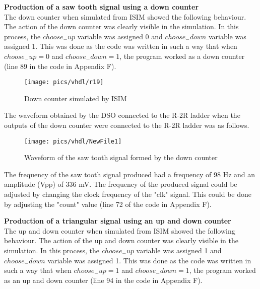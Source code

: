 \pagebreak

\noindent
\textbf{Production of a saw tooth signal using a down counter}\\


\noindent
The  down counter when simulated from ISIM showed the following behaviour. The action of the down counter was clearly visible in the simulation.  In this process, the $  choose_{-}up $ variable was assigned 0 and $ choose_{-}down $ variable was assigned 1. This was done as the code was written in such a way that when  $ choose_{-}up = 0 $ and $ choose_{-}down = 1 $, the program worked as a down counter (line 89 in the code in Appendix F). 


\begin{figure}[!h]
	\centering
	\texttt{[image: pics/vhdl/r19]}
	\caption{Down counter simulated by ISIM}
	\label{fig:r17}
\end{figure}

\noindent
The waveform obtained by the DSO connected to the R-2R ladder when the outputs of the down counter were connected to the R-2R ladder was as follows.

\begin{figure}[!h]
	\centering
	\texttt{[image: pics/vhdl/NewFile1]}
	\caption{Waveform of the saw tooth signal formed by the down counter}
	\label{fig:newfile0}
\end{figure}

\noindent
The frequency of the saw tooth signal produced had a frequency of 98 Hz and an amplitude (Vpp) of 336 mV. The frequency of the produced signal could be adjusted by changing the clock frequency of the "clk" signal. This could be done by adjusting the "count" value (line 72 of the code in Appendix F).\\

\pagebreak


\noindent
\textbf{Production of a triangular signal using an up and down counter} \\

\noindent
The  up and down counter when simulated from ISIM showed the following behaviour. The action of the up and down counter was clearly visible in the simulation.  In this process, the $  choose_{-}up $ variable was assigned 1 and $ choose_{-}down $ variable was assigned 1. This was done as the code was written in such a way that when  $ choose_{-}up = 1 $ and $ choose_{-}down = 1 $, the program worked as an up and down counter (line 94 in the code in Appendix F). 

